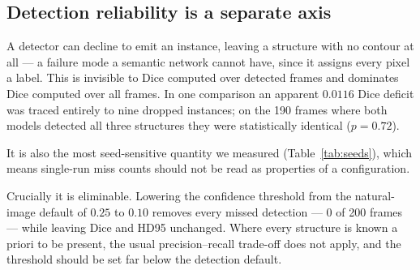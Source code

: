 \subsection{Detection reliability is a separate axis}
\label{sec:detection}

A detector can decline to emit an instance, leaving a structure with no contour
at all --- a failure mode a semantic network cannot have, since it assigns every
pixel a label. This is invisible to Dice computed over detected frames and
dominates Dice computed over all frames. In one comparison an apparent $0.0116$
Dice deficit was traced entirely to nine dropped instances; on the 190 frames
where both models detected all three structures they were statistically
identical ($p{=}0.72$).

It is also the most seed-sensitive quantity we measured (Table~\ref{tab:seeds}),
which means single-run miss counts should not be read as properties of a
configuration.

Crucially it is eliminable. Lowering the confidence threshold from the
natural-image default of $0.25$ to $0.10$ removes every missed detection --- 0
of 200 frames --- while leaving Dice and HD95 unchanged. Where every structure
is known a priori to be present, the usual precision--recall trade-off does not
apply, and the threshold should be set far below the detection default.
